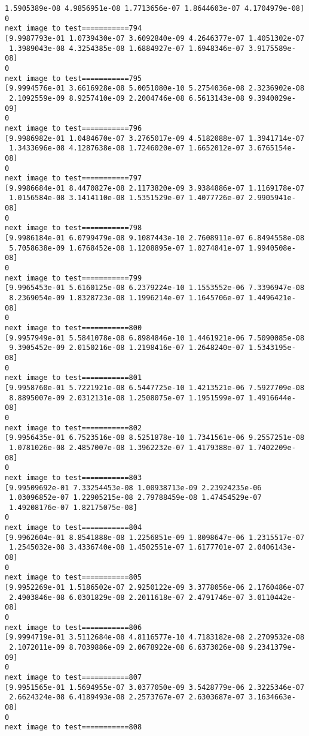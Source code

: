 \documentclass[11pt]{article}
\begin{document}
\begin{Verbatim}[commandchars=\\\{\}]
 1.5905389e-08 4.9856951e-08 1.7713656e-07 1.8644603e-07 4.1704979e-08]
0
next image to test===========794
[9.9987793e-01 1.0739430e-07 3.6092840e-09 4.2646377e-07 1.4051302e-07
 1.3989043e-08 4.3254385e-08 1.6884927e-07 1.6948346e-07 3.9175589e-08]
0
next image to test===========795
[9.9994576e-01 3.6616928e-08 5.0051080e-10 5.2754036e-08 2.3236902e-08
 2.1092559e-09 8.9257410e-09 2.2004746e-08 6.5613143e-08 9.3940029e-09]
0
next image to test===========796
[9.9986982e-01 1.0484670e-07 3.2765017e-09 4.5182088e-07 1.3941714e-07
 1.3433696e-08 4.1287638e-08 1.7246020e-07 1.6652012e-07 3.6765154e-08]
0
next image to test===========797
[9.9986684e-01 8.4470827e-08 2.1173820e-09 3.9384886e-07 1.1169178e-07
 1.0156584e-08 3.1414110e-08 1.5351529e-07 1.4077726e-07 2.9905941e-08]
0
next image to test===========798
[9.9986184e-01 6.0799479e-08 9.1087443e-10 2.7608911e-07 6.8494558e-08
 5.7058638e-09 1.6768452e-08 1.1208895e-07 1.0274841e-07 1.9940508e-08]
0
next image to test===========799
[9.9965453e-01 5.6160125e-08 6.2379224e-10 1.1553552e-06 7.3396947e-08
 8.2369054e-09 1.8328723e-08 1.1996214e-07 1.1645706e-07 1.4496421e-08]
0
next image to test===========800
[9.9957949e-01 5.5841078e-08 6.8984846e-10 1.4461921e-06 7.5090085e-08
 9.3905452e-09 2.0150216e-08 1.2198416e-07 1.2648240e-07 1.5343195e-08]
0
next image to test===========801
[9.9958760e-01 5.7221921e-08 6.5447725e-10 1.4213521e-06 7.5927709e-08
 8.8895007e-09 2.0312131e-08 1.2508075e-07 1.1951599e-07 1.4916644e-08]
0
next image to test===========802
[9.9956435e-01 6.7523516e-08 8.5251878e-10 1.7341561e-06 9.2557251e-08
 1.0781026e-08 2.4857007e-08 1.3962232e-07 1.4179388e-07 1.7402209e-08]
0
next image to test===========803
[9.99509692e-01 7.33254453e-08 1.00938713e-09 2.23924235e-06
 1.03096852e-07 1.22905215e-08 2.79788459e-08 1.47454529e-07
 1.49208176e-07 1.82175075e-08]
0
next image to test===========804
[9.9962604e-01 8.8541888e-08 1.2256851e-09 1.8098647e-06 1.2315517e-07
 1.2545032e-08 3.4336740e-08 1.4502551e-07 1.6177701e-07 2.0406143e-08]
0
next image to test===========805
[9.9952269e-01 1.5186502e-07 2.9250122e-09 3.3778056e-06 2.1760486e-07
 2.4903846e-08 6.0301829e-08 2.2011618e-07 2.4791746e-07 3.0110442e-08]
0
next image to test===========806
[9.9994719e-01 3.5112684e-08 4.8116577e-10 4.7183182e-08 2.2709532e-08
 2.1072011e-09 8.7039886e-09 2.0678922e-08 6.6373026e-08 9.2341379e-09]
0
next image to test===========807
[9.9951565e-01 1.5694955e-07 3.0377050e-09 3.5428779e-06 2.3225346e-07
 2.6624324e-08 6.4189493e-08 2.2573767e-07 2.6303687e-07 3.1634663e-08]
0
next image to test===========808

\end{Verbatim}
\end{document}
